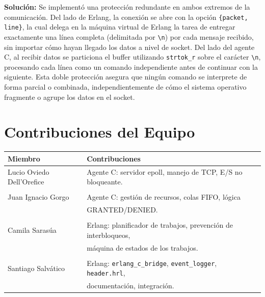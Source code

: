 \documentclass[12pt,a4paper]{article}
\begin{document}
\textbf{Solución:} Se implementó una protección redundante en ambos extremos de la comunicación. Del lado de Erlang, la conexión se abre con la opción \texttt{\{packet, line\}}, la cual delega en la máquina virtual de Erlang la tarea de entregar exactamente una línea completa (delimitada por \texttt{\textbackslash n}) por cada mensaje recibido, sin importar cómo hayan llegado los datos a nivel de socket. Del lado del agente C, al recibir datos se particiona el buffer utilizando \texttt{strtok\_r} sobre el carácter \texttt{\textbackslash n}, procesando cada línea como un comando independiente antes de continuar con la siguiente. Esta doble protección asegura que ningún comando se interprete de forma parcial o combinada, independientemente de cómo el sistema operativo fragmente o agrupe los datos en el socket.

\section{Contribuciones del Equipo}

\begin{center}
\begin{tabular}{ll}
\toprule
\textbf{Miembro} & \textbf{Contribuciones} \\
\midrule
Lucio Oviedo Dell'Orefice & Agente C: servidor epoll, manejo de TCP, E/S no bloqueante. \\\\
Juan Ignacio Gorgo & Agente C: gestión de recursos, colas FIFO, lógica \\ &      GRANTED/DENIED. \\\\
Camila Sarasúa & Erlang: planificador de trabajos, prevención de interbloqueos, \\ & máquina de estados de los trabajos. \\\\
Santiago Salvático & Erlang: \texttt{erlang\_c\_bridge}, \texttt{event\_logger}, \texttt{header.hrl},\\ & documentación, integración. \\
\bottomrule
\end{tabular}
\end{center}
\end{document}
